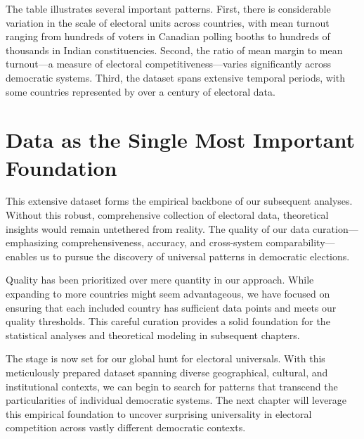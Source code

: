 The table illustrates several important patterns. First, there is considerable variation in the scale of electoral units across countries, with mean turnout ranging from hundreds of voters in Canadian polling booths to hundreds of thousands in Indian constituencies. Second, the ratio of mean margin to mean turnout—a measure of electoral competitiveness—varies significantly across democratic systems. Third, the dataset spans extensive temporal periods, with some countries represented by over a century of electoral data.

\section{Data as the Single Most Important Foundation}

This extensive dataset forms the empirical backbone of our subsequent analyses. Without this robust, comprehensive collection of electoral data, theoretical insights would remain untethered from reality. The quality of our data curation—emphasizing comprehensiveness, accuracy, and cross-system comparability—enables us to pursue the discovery of universal patterns in democratic elections.

Quality has been prioritized over mere quantity in our approach. While expanding to more countries might seem advantageous, we have focused on ensuring that each included country has sufficient data points and meets our quality thresholds. This careful curation provides a solid foundation for the statistical analyses and theoretical modeling in subsequent chapters.

The stage is now set for our global hunt for electoral universals. With this meticulously prepared dataset spanning diverse geographical, cultural, and institutional contexts, we can begin to search for patterns that transcend the particularities of individual democratic systems. The next chapter will leverage this empirical foundation to uncover surprising universality in electoral competition across vastly different democratic contexts.
